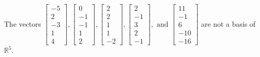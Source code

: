 \begin{exercise}
\begin{exerciseStatement}
  \end{exerciseStatement}
  \begin{exerciseAnswer}
   The vectors \(\left[\begin{array}{r}
-5 \\
2 \\
-3 \\
1 \\
4
\end{array}\right] , \left[\begin{array}{r}
0 \\
-1 \\
-1 \\
1 \\
2
\end{array}\right] , \left[\begin{array}{r}
2 \\
2 \\
1 \\
1 \\
-2
\end{array}\right] , \left[\begin{array}{r}
2 \\
-1 \\
3 \\
2 \\
-1
\end{array}\right] , \text{ and } \left[\begin{array}{r}
11 \\
-1 \\
6 \\
-10 \\
-16
\end{array}\right]\) 
  	 are not  a basis of \(\mathbb{R}^5\).
  


  \end{exerciseAnswer}
\end{exercise}